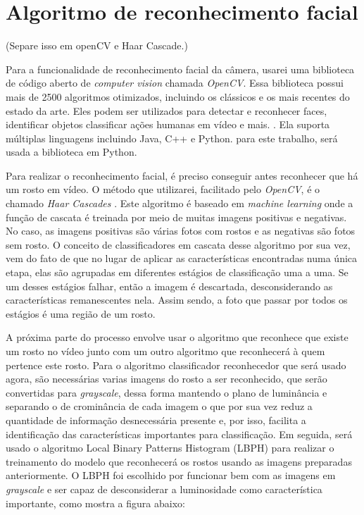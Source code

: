 \documentclass[12pt, %
openright, 
oneside, %
a4paper,    %
brazil]{facom-ufu-abntex2}
\begin{document}
\section{Algoritmo de reconhecimento facial}

 (Separe isso em openCV e Haar Cascade.)

Para a funcionalidade de reconhecimento facial da câmera, usarei uma biblioteca
de código aberto de \emph{computer vision} chamada \emph{OpenCV}. Essa
biblioteca possui mais de 2500 algoritmos otimizados, incluindo os clássicos e
os mais recentes do estado da arte. Eles podem ser utilizados para detectar e
reconhecer faces, identificar objetos classificar ações humanas em vídeo e
mais. \cite{opencv}. Ela suporta múltiplas linguagens incluindo Java, C++ e
Python. para este trabalho, será usada a biblioteca em Python.

Para realizar o reconhecimento facial, é preciso conseguir antes reconhecer que
há um rosto em vídeo. O método que utilizarei, facilitado pelo \emph{OpenCV}, é
o chamado \emph{Haar Cascades} \cite{viola2001rapid}. Este algoritmo é baseado
em \emph{machine learning} onde a função de cascata é treinada por meio de
muitas imagens positivas e negativas. No caso, as imagens positivas são várias
fotos com rostos e as negativas são fotos sem rosto. O conceito de
classificadores em cascata desse algoritmo por sua vez, vem do fato de que no
lugar de aplicar as características encontradas numa única etapa, elas são
agrupadas em diferentes estágios de classificação uma a uma. Se um desses
estágios falhar, então a imagem é descartada, desconsiderando as
características remanescentes nela. Assim sendo, a foto que passar por todos os
estágios é uma região de um rosto.

A próxima parte do processo envolve usar o algoritmo que reconhece que existe
um rosto no vídeo junto com um outro algoritmo que reconhecerá à quem pertence
este rosto. Para o algoritmo classificador reconhecedor que será usado agora,
são necessárias varias imagens do rosto a ser reconhecido, que serão
convertidas para \emph{grayscale}, dessa forma mantendo o plano de luminância e
separando o de crominância de cada imagem o que por sua vez reduz a quantidade
de informação desnecessária presente e, por isso, facilita a identificação das
características importantes para classificação. Em seguida, será usado o
algoritmo Local Binary Patterns Histogram (LBPH) para realizar o treinamento do
modelo que reconhecerá os rostos usando as imagens preparadas anteriormente. O
LBPH foi escolhido por funcionar bem com as imagens em \emph{grayscale} e ser
capaz de desconsiderar a luminosidade como característica importante, como
mostra a figura abaixo:
\end{document}
